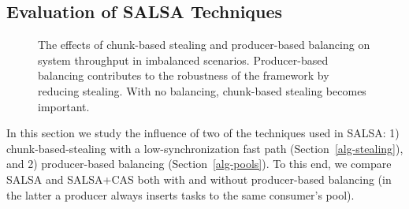 \subsection{Evaluation of SALSA Techniques}
\label{sec:eval-techniques}
\begin{figure}[htb]
	\centering
	\caption{\footnotesize{The effects of chunk-based stealing and producer-based balancing on system throughput in imbalanced scenarios. Producer-based balancing contributes to the robustness of the framework by reducing stealing. With no balancing, chunk-based stealing becomes important. }}
	\label{fig:1-n-salsa}
\end{figure}
In this section we study the influence of two of the techniques used in SALSA: 1) chunk-based-stealing with a low-synchronization fast path (Section~\ref{alg-stealing}), and 2) producer-based balancing (Section~\ref{alg-pools}). 
To this end, we compare SALSA and SALSA+CAS both with and without producer-based balancing (in the latter a producer always inserts tasks to the same consumer's pool).


